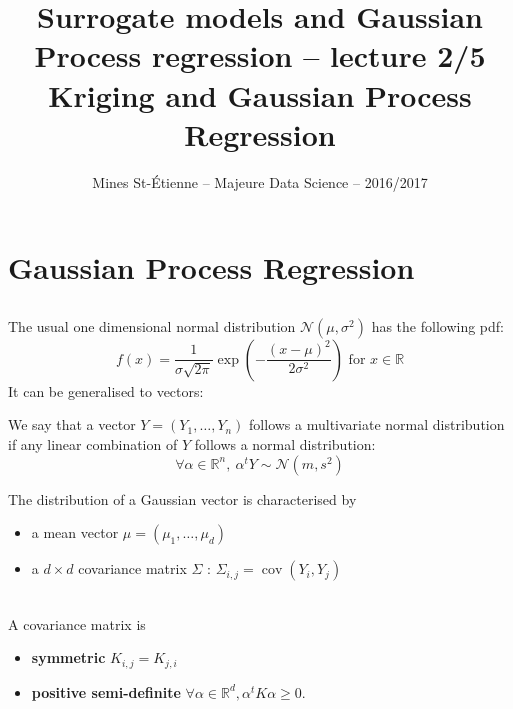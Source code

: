 \documentclass{beamer}
\title[Majeure Data Science -- Surrogate models and GPR]{\texorpdfstring{ \small Surrogate models and Gaussian Process regression -- lecture 2/5 \\ \vspace{3mm} \LARGE Kriging and Gaussian Process Regression}{}}
\author[Mines St-\'Etienne ]{Mines St-\'Etienne -- Majeure Data Science -- 2016/2017}
\institute{\texorpdfstring{Nicolas Durrande (durrande@emse.fr)}{}}
\date{\null}
\DeclareMathOperator*{\Cov}{cov}
\begin{document}
\begin{frame}
  \titlepage
\end{frame}

\section{Gaussian Process Regression}
\subsection{}

\begin{frame}{}
The usual one dimensional normal distribution $\mathcal{N}(\mu,\sigma^2)$ has the following pdf:
\begin{equation*}
f(x) = \frac{1}{\sigma \sqrt{2 \pi}} \exp \left(-\frac{(x-\mu)^2}{2 \sigma^2} \right) \text{ for } x \in \mathds{R}
\end{equation*} 
It can be generalised to vectors:
\begin{definition}
	We say that a vector $Y=(Y_1, \dots, Y_n)$ follows a multivariate normal distribution if any linear combination of $Y$ follows a normal distribution:
	\begin{equation*}
		\forall \alpha \in \mathds{R}^n,\ \alpha^t Y \sim \mathcal{N}(m,s^2)
	\end{equation*}
\end{definition}
\end{frame}

\begin{frame}{}
The distribution of a Gaussian vector is characterised by
\begin{itemize}
 	\item a mean vector $\mu = (\mu_1, \dots, \mu_d)$
 	\item a $d \times d$ covariance matrix $\Sigma$ : $\Sigma_{i,j}=\Cov(Y_i, Y_j)$
\end{itemize} 
\vspace{5mm}
\\
A covariance matrix is 
\begin{itemize}
	\item \textbf{symmetric} $K_{i,j}=K_{j,i}$
	\item \textbf{positive semi-definite} $\forall \alpha \in \mathds{R}^d, \alpha^t K \alpha \geq 0$.
\end{itemize} 
\end{frame}
\end{document}
